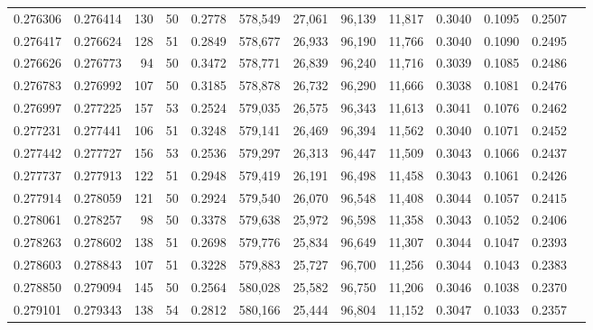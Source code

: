 \begin{tabular}{rrrrrrrrrrrrr}
0.276306 & 0.276414 &   130 &  50 &                                     0.2778 & 578,549 &  27,061 &  96,139 &  11,817 & 0.3040 & 0.1095 & 0.2507 \\
0.276417 & 0.276624 &   128 &  51 &                                     0.2849 & 578,677 &  26,933 &  96,190 &  11,766 & 0.3040 & 0.1090 & 0.2495 \\
0.276626 & 0.276773 &    94 &  50 &                                     0.3472 & 578,771 &  26,839 &  96,240 &  11,716 & 0.3039 & 0.1085 & 0.2486 \\
0.276783 & 0.276992 &   107 &  50 &                                     0.3185 & 578,878 &  26,732 &  96,290 &  11,666 & 0.3038 & 0.1081 & 0.2476 \\
0.276997 & 0.277225 &   157 &  53 &                                     0.2524 & 579,035 &  26,575 &  96,343 &  11,613 & 0.3041 & 0.1076 & 0.2462 \\
0.277231 & 0.277441 &   106 &  51 &                                     0.3248 & 579,141 &  26,469 &  96,394 &  11,562 & 0.3040 & 0.1071 & 0.2452 \\
0.277442 & 0.277727 &   156 &  53 &                                     0.2536 & 579,297 &  26,313 &  96,447 &  11,509 & 0.3043 & 0.1066 & 0.2437 \\
0.277737 & 0.277913 &   122 &  51 &                                     0.2948 & 579,419 &  26,191 &  96,498 &  11,458 & 0.3043 & 0.1061 & 0.2426 \\
0.277914 & 0.278059 &   121 &  50 &                                     0.2924 & 579,540 &  26,070 &  96,548 &  11,408 & 0.3044 & 0.1057 & 0.2415 \\
0.278061 & 0.278257 &    98 &  50 &                                     0.3378 & 579,638 &  25,972 &  96,598 &  11,358 & 0.3043 & 0.1052 & 0.2406 \\
0.278263 & 0.278602 &   138 &  51 &                                     0.2698 & 579,776 &  25,834 &  96,649 &  11,307 & 0.3044 & 0.1047 & 0.2393 \\
0.278603 & 0.278843 &   107 &  51 &                                     0.3228 & 579,883 &  25,727 &  96,700 &  11,256 & 0.3044 & 0.1043 & 0.2383 \\
0.278850 & 0.279094 &   145 &  50 &                                     0.2564 & 580,028 &  25,582 &  96,750 &  11,206 & 0.3046 & 0.1038 & 0.2370 \\
0.279101 & 0.279343 &   138 &  54 &                                     0.2812 & 580,166 &  25,444 &  96,804 &  11,152 & 0.3047 & 0.1033 & 0.2357 \\

\end{tabular}
